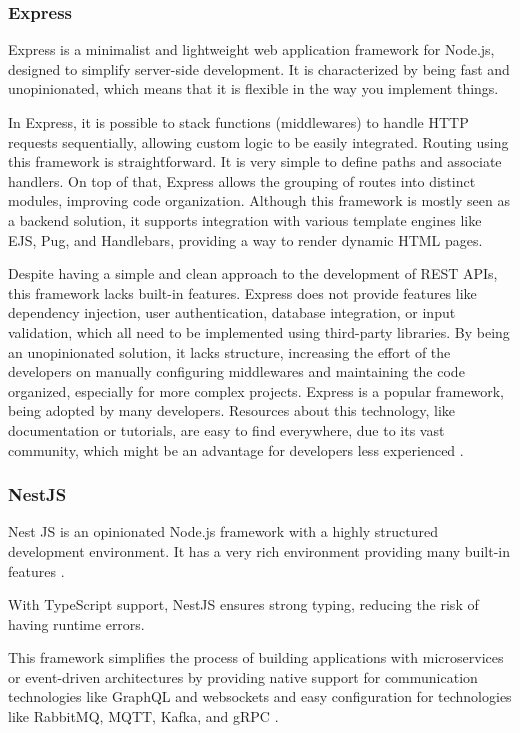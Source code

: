 \subsubsection{Express}
Express is a minimalist and lightweight web application framework for Node.js,
designed to simplify server-side development. It is characterized by being
fast and unopinionated, which means that it is flexible in the way you implement
things.

In Express, it is possible to stack functions (middlewares) to handle \gls{HTTP}
requests sequentially, allowing custom logic to be easily integrated.
Routing using this framework is straightforward. It is very simple to define
paths and associate handlers. On top of that, Express allows the grouping of
routes into distinct modules, improving code organization.
Although this framework is mostly seen as a backend solution, it supports
integration with various template engines like \gls{EJS}, Pug, and Handlebars,
providing a way to render dynamic \gls{HTML} pages.

Despite having a simple and clean approach to the development of \gls{REST} \gls{API}s,
this framework lacks built-in features. Express does not provide features like
dependency injection, user authentication, database integration, or input
validation, which all need to be implemented using third-party libraries.
By being an unopinionated solution, it lacks structure, increasing the effort
of the developers on manually configuring middlewares and maintaining the code
organized, especially for more complex projects.
Express is a popular framework, being adopted by many developers. Resources
about this technology, like documentation or tutorials, are easy to find
everywhere, due to its vast community, which might be an advantage for
developers less experienced \cite{expressJSMDN}.

\subsubsection{NestJS}
Nest JS is an opinionated Node.js framework with a highly structured
development environment. It has a very rich environment providing many built-in
features \cite{nestJS}.

With TypeScript support, NestJS ensures strong typing, reducing the risk of
having runtime errors.

This framework simplifies the process of building applications with
microservices or event-driven architectures by providing native support for
communication technologies like GraphQL and websockets and easy configuration
for technologies like RabbitMQ, \gls{MQTT}, Kafka, and \gls{gRPC} \cite{nestJS}.

